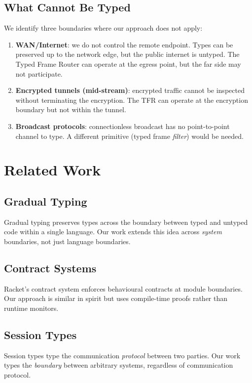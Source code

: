 \documentclass[11pt,a4paper]{article}
\begin{document}
\subsection{What Cannot Be Typed}

We identify three boundaries where our approach does not apply:

\begin{enumerate}
\item \textbf{WAN/Internet}: we do not control the remote endpoint.
  Types can be preserved up to the network edge, but the public internet
  is untyped. The Typed Frame Router can operate at the egress point,
  but the far side may not participate.
\item \textbf{Encrypted tunnels (mid-stream)}: encrypted traffic cannot
  be inspected without terminating the encryption. The TFR can operate
  at the encryption boundary but not within the tunnel.
\item \textbf{Broadcast protocols}: connectionless broadcast has no
  point-to-point channel to type. A different primitive (typed frame
  \emph{filter}) would be needed.
\end{enumerate}

\section{Related Work}

\subsection{Gradual Typing}
Gradual typing \cite{siek2006} preserves types across the boundary
between typed and untyped code within a single language. Our work
extends this idea across \emph{system} boundaries, not just language
boundaries.

\subsection{Contract Systems}
Racket's contract system \cite{findler2002} enforces behavioural
contracts at module boundaries. Our approach is similar in spirit but
uses compile-time proofs rather than runtime monitors.

\subsection{Session Types}
Session types \cite{honda1993} type the communication \emph{protocol}
between two parties. Our work types the \emph{boundary} between
arbitrary systems, regardless of communication protocol.
\end{document}
